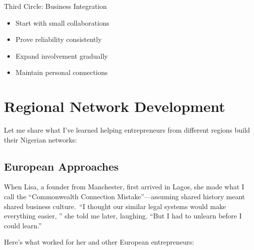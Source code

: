Third Circle: Business Integration
\begin{itemize}
    \item Start with small collaborations
    \item Prove reliability consistently
    \item Expand involvement gradually
    \item Maintain personal connections
\end{itemize}

\section{Regional Network Development}\label{sec:regional-networks}

Let me share what I've learned helping entrepreneurs from different regions build their Nigerian networks:

\subsection{European Approaches}\label{subsec:european-networks}

When Lisa, a founder from Manchester, first arrived in Lagos, she made what I call the ``Commonwealth Connection Mistake''—assuming shared history meant shared business culture.\ ``I thought our similar legal systems would make everything easier, '' she told me later, laughing. ``But I had to unlearn before I could learn.''

Here's what worked for her and other European entrepreneurs:

